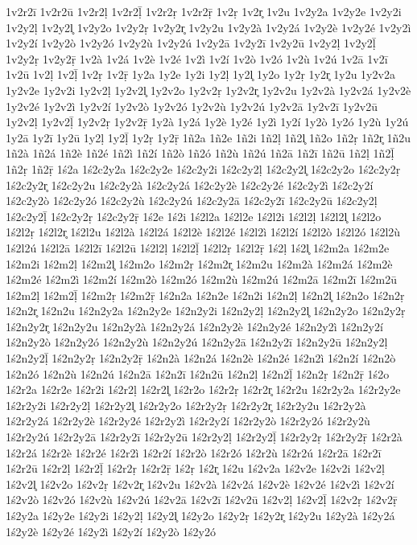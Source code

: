 {1v2r2ī
1v2r2ū
1v2r2ḷ
1v2r2ḹ
1v2r2ṛ
1v2r2ṝ
1v2ṛ
1v2r̥
1v2u
1v2y2a
1v2y2e
1v2y2i
1v2y2ḷ
1v2y2l̥
1v2y2o
1v2y2ṛ
1v2y2r̥
1v2y2u
1v2y2à
1v2y2á
1v2y2è
1v2y2é
1v2y2ì
1v2y2í
1v2y2ò
1v2y2ó
1v2y2ù
1v2y2ú
1v2y2ā
1v2y2ī
1v2y2ū
1v2y2ḷ
1v2y2ḹ
1v2y2ṛ
1v2y2ṝ
1v2à
1v2á
1v2è
1v2é
1v2ì
1v2í
1v2ò
1v2ó
1v2ù
1v2ú
1v2ā
1v2ī
1v2ū
1v2ḷ
1v2ḹ
1v2ṛ
1v2ṝ
1y2a
1y2e
1y2i
1y2ḷ
1y2l̥
1y2o
1y2ṛ
1y2r̥
1y2u
1y2v2a
1y2v2e
1y2v2i
1y2v2ḷ
1y2v2l̥
1y2v2o
1y2v2ṛ
1y2v2r̥
1y2v2u
1y2v2à
1y2v2á
1y2v2è
1y2v2é
1y2v2ì
1y2v2í
1y2v2ò
1y2v2ó
1y2v2ù
1y2v2ú
1y2v2ā
1y2v2ī
1y2v2ū
1y2v2ḷ
1y2v2ḹ
1y2v2ṛ
1y2v2ṝ
1y2à
1y2á
1y2è
1y2é
1y2ì
1y2í
1y2ò
1y2ó
1y2ù
1y2ú
1y2ā
1y2ī
1y2ū
1y2ḷ
1y2ḹ
1y2ṛ
1y2ṝ
1ñ2a
1ñ2e
1ñ2i
1ñ2ḷ
1ñ2l̥
1ñ2o
1ñ2ṛ
1ñ2r̥
1ñ2u
1ñ2à
1ñ2á
1ñ2è
1ñ2é
1ñ2ì
1ñ2í
1ñ2ò
1ñ2ó
1ñ2ù
1ñ2ú
1ñ2ā
1ñ2ī
1ñ2ū
1ñ2ḷ
1ñ2ḹ
1ñ2ṛ
1ñ2ṝ
1ś2a
1ś2c2y2a
1ś2c2y2e
1ś2c2y2i
1ś2c2y2ḷ
1ś2c2y2l̥
1ś2c2y2o
1ś2c2y2ṛ
1ś2c2y2r̥
1ś2c2y2u
1ś2c2y2à
1ś2c2y2á
1ś2c2y2è
1ś2c2y2é
1ś2c2y2ì
1ś2c2y2í
1ś2c2y2ò
1ś2c2y2ó
1ś2c2y2ù
1ś2c2y2ú
1ś2c2y2ā
1ś2c2y2ī
1ś2c2y2ū
1ś2c2y2ḷ
1ś2c2y2ḹ
1ś2c2y2ṛ
1ś2c2y2ṝ
1ś2e
1ś2i
1ś2l2a
1ś2l2e
1ś2l2i
1ś2l2ḷ
1ś2l2l̥
1ś2l2o
1ś2l2ṛ
1ś2l2r̥
1ś2l2u
1ś2l2à
1ś2l2á
1ś2l2è
1ś2l2é
1ś2l2ì
1ś2l2í
1ś2l2ò
1ś2l2ó
1ś2l2ù
1ś2l2ú
1ś2l2ā
1ś2l2ī
1ś2l2ū
1ś2l2ḷ
1ś2l2ḹ
1ś2l2ṛ
1ś2l2ṝ
1ś2ḷ
1ś2l̥
1ś2m2a
1ś2m2e
1ś2m2i
1ś2m2ḷ
1ś2m2l̥
1ś2m2o
1ś2m2ṛ
1ś2m2r̥
1ś2m2u
1ś2m2à
1ś2m2á
1ś2m2è
1ś2m2é
1ś2m2ì
1ś2m2í
1ś2m2ò
1ś2m2ó
1ś2m2ù
1ś2m2ú
1ś2m2ā
1ś2m2ī
1ś2m2ū
1ś2m2ḷ
1ś2m2ḹ
1ś2m2ṛ
1ś2m2ṝ
1ś2n2a
1ś2n2e
1ś2n2i
1ś2n2ḷ
1ś2n2l̥
1ś2n2o
1ś2n2ṛ
1ś2n2r̥
1ś2n2u
1ś2n2y2a
1ś2n2y2e
1ś2n2y2i
1ś2n2y2ḷ
1ś2n2y2l̥
1ś2n2y2o
1ś2n2y2ṛ
1ś2n2y2r̥
1ś2n2y2u
1ś2n2y2à
1ś2n2y2á
1ś2n2y2è
1ś2n2y2é
1ś2n2y2ì
1ś2n2y2í
1ś2n2y2ò
1ś2n2y2ó
1ś2n2y2ù
1ś2n2y2ú
1ś2n2y2ā
1ś2n2y2ī
1ś2n2y2ū
1ś2n2y2ḷ
1ś2n2y2ḹ
1ś2n2y2ṛ
1ś2n2y2ṝ
1ś2n2à
1ś2n2á
1ś2n2è
1ś2n2é
1ś2n2ì
1ś2n2í
1ś2n2ò
1ś2n2ó
1ś2n2ù
1ś2n2ú
1ś2n2ā
1ś2n2ī
1ś2n2ū
1ś2n2ḷ
1ś2n2ḹ
1ś2n2ṛ
1ś2n2ṝ
1ś2o
1ś2r2a
1ś2r2e
1ś2r2i
1ś2r2ḷ
1ś2r2l̥
1ś2r2o
1ś2r2ṛ
1ś2r2r̥
1ś2r2u
1ś2r2y2a
1ś2r2y2e
1ś2r2y2i
1ś2r2y2ḷ
1ś2r2y2l̥
1ś2r2y2o
1ś2r2y2ṛ
1ś2r2y2r̥
1ś2r2y2u
1ś2r2y2à
1ś2r2y2á
1ś2r2y2è
1ś2r2y2é
1ś2r2y2ì
1ś2r2y2í
1ś2r2y2ò
1ś2r2y2ó
1ś2r2y2ù
1ś2r2y2ú
1ś2r2y2ā
1ś2r2y2ī
1ś2r2y2ū
1ś2r2y2ḷ
1ś2r2y2ḹ
1ś2r2y2ṛ
1ś2r2y2ṝ
1ś2r2à
1ś2r2á
1ś2r2è
1ś2r2é
1ś2r2ì
1ś2r2í
1ś2r2ò
1ś2r2ó
1ś2r2ù
1ś2r2ú
1ś2r2ā
1ś2r2ī
1ś2r2ū
1ś2r2ḷ
1ś2r2ḹ
1ś2r2ṛ
1ś2r2ṝ
1ś2ṛ
1ś2r̥
1ś2u
1ś2v2a
1ś2v2e
1ś2v2i
1ś2v2ḷ
1ś2v2l̥
1ś2v2o
1ś2v2ṛ
1ś2v2r̥
1ś2v2u
1ś2v2à
1ś2v2á
1ś2v2è
1ś2v2é
1ś2v2ì
1ś2v2í
1ś2v2ò
1ś2v2ó
1ś2v2ù
1ś2v2ú
1ś2v2ā
1ś2v2ī
1ś2v2ū
1ś2v2ḷ
1ś2v2ḹ
1ś2v2ṛ
1ś2v2ṝ
1ś2y2a
1ś2y2e
1ś2y2i
1ś2y2ḷ
1ś2y2l̥
1ś2y2o
1ś2y2ṛ
1ś2y2r̥
1ś2y2u
1ś2y2à
1ś2y2á
1ś2y2è
1ś2y2é
1ś2y2ì
1ś2y2í
1ś2y2ò
1ś2y2ó
}
